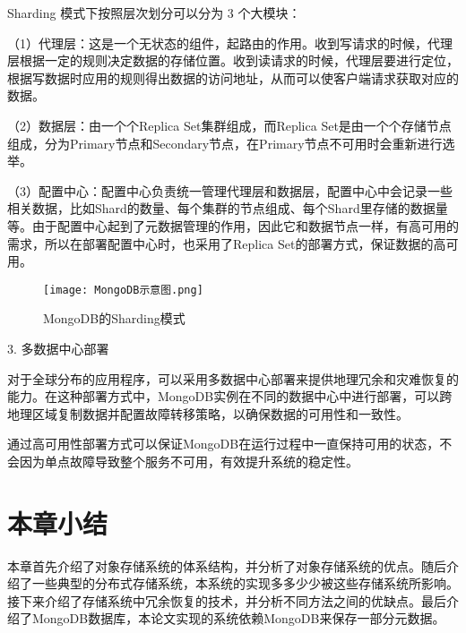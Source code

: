 Sharding 模式下按照层次划分可以分为 3 个大模块：

（1）代理层：这是一个无状态的组件，起路由的作用。收到写请求的时候，代理层根据一定的规则决定数据的存储位置。收到读请求的时候，代理层要进行定位，根据写数据时应用的规则得出数据的访问地址，从而可以使客户端请求获取对应的数据。

（2）数据层：由一个个Replica Set集群组成，而Replica Set是由一个个存储节点组成，分为Primary节点和Secondary节点，在Primary节点不可用时会重新进行选举。

（3）配置中心：配置中心负责统一管理代理层和数据层，配置中心中会记录一些相关数据，比如Shard的数量、每个集群的节点组成、每个Shard里存储的数据量等。由于配置中心起到了元数据管理的作用，因此它和数据节点一样，有高可用的需求，所以在部署配置中心时，也采用了Replica Set的部署方式，保证数据的高可用。

\begin{figure}[h]
    \centering
    \texttt{[image: MongoDB示意图.png]}
    \caption{MongoDB的Sharding模式}
\end{figure}

3. 多数据中心部署

对于全球分布的应用程序，可以采用多数据中心部署来提供地理冗余和灾难恢复的能力。在这种部署方式中，MongoDB实例在不同的数据中心中进行部署，可以跨地理区域复制数据并配置故障转移策略，以确保数据的可用性和一致性。

通过高可用性部署方式可以保证MongoDB在运行过程中一直保持可用的状态，不会因为单点故障导致整个服务不可用，有效提升系统的稳定性。

\section{本章小结}%
本章首先介绍了对象存储系统的体系结构，并分析了对象存储系统的优点。随后介绍了一些典型的分布式存储系统，本系统的实现多多少少被这些存储系统所影响。接下来介绍了存储系统中冗余恢复的技术，并分析不同方法之间的优缺点。最后介绍了MongoDB数据库，本论文实现的系统依赖MongoDB来保存一部分元数据。
